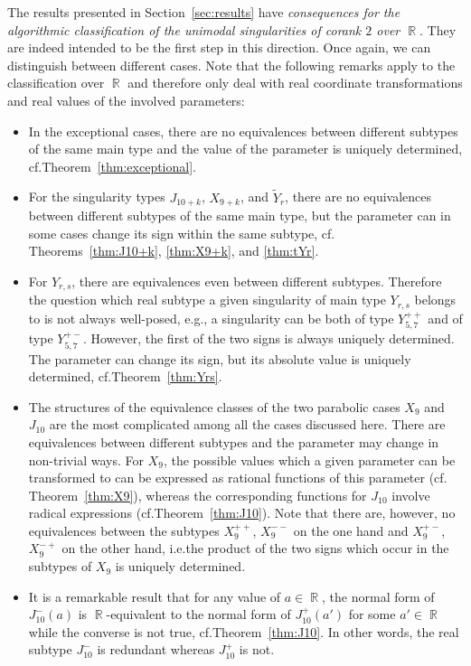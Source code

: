 \documentclass{amsproc}
\theoremstyle{definition}
\newcommand{\tY}{\widetilde{Y}}
\DeclareMathOperator{\R}{\mathbb{R}}
\begin{document}
The results presented in Section~\ref{sec:results} have \emph{consequences for
the algorithmic classification of the unimodal singularities of corank $2$ over
$\R$}. They are indeed intended to be the first step in this direction. Once
again, we can distinguish between different cases. Note that the following
remarks apply to the classification over $\R$ and therefore only deal with real
coordinate transformations and real values of the involved parameters:
\begin{itemize}
\item
In the exceptional cases, there are no equivalences between different subtypes
of the same main type and the value of the parameter is uniquely determined,
cf.\@ Theorem~\ref{thm:exceptional}.
\item
For the singularity types $J_{10+k}$, $X_{9+k}$, and $\tY_r$, there are no
equivalences between different subtypes of the same main type, but the
parameter can in some cases change its sign within the same subtype, cf.\@
Theorems~\ref{thm:J10+k}, \ref{thm:X9+k}, and \ref{thm:tYr}.
\item
For $Y_{r,s}$, there are equivalences even between different subtypes.
Therefore the question which real subtype a given singularity of main type
$Y_{r,s}$ belongs to is not always well-posed, e.g., a singularity can be both
of type $Y_{5,7}^{++}$ and of type $Y_{5,7}^{+-}$. However, the first of the
two signs is always uniquely determined. The parameter can change its sign, but
its absolute value is uniquely determined, cf.\@ Theorem~\ref{thm:Yrs}.
\item
The structures of the equivalence classes of the two parabolic cases $X_9$ and
$J_{10}$ are the most complicated among all the cases discussed here. There are
equivalences between different subtypes and the parameter may change in
non-trivial ways. For $X_9$, the possible values which a given parameter can be
transformed to can be expressed as rational functions of this parameter (cf.\@
Theorem~\ref{thm:X9}), whereas the corresponding functions for $J_{10}$ involve
radical expressions (cf.\@ Theorem~\ref{thm:J10}). Note that there are,
however, no equivalences between the subtypes $X_9^{++}$, $X_9^{--}$ on the one
hand and $X_9^{+-}$, $X_9^{-+}$ on the other hand, i.e.\@ the product of the
two signs which occur in the subtypes of $X_9$ is uniquely determined.
\item
It is a remarkable result that for any value of $a \in \R$, the normal form of
$J_{10}^-(a)$ is $\R$-equivalent to the normal form of $J_{10}^+(a')$ for some
$a' \in \R$ while the converse is not true, cf.\@ Theorem~\ref{thm:J10}. In
other words, the real subtype $J_{10}^-$ is redundant whereas $J_{10}^+$ is
not.
\end{itemize}
\end{document}
